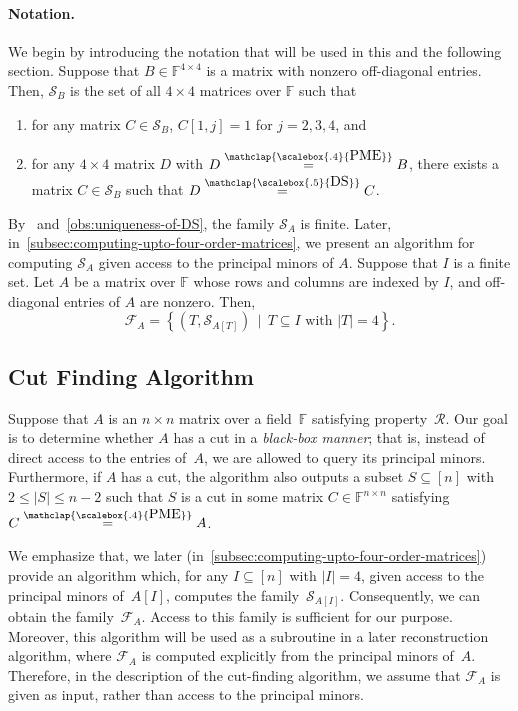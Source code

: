 \documentclass[11pt,letterpaper]{article}
\newcommand{\F}{\mathbb{F}}
\newcommand{\DS}{\stackrel{\mathclap{\scalebox{.5}{\mbox{DS}}}}{=}}
\newcommand{\PME}{\stackrel{\mathclap{\scalebox{.4}{\mbox{PME}}}}{=}}
\newcommand{\prop}{\mathcal{R}}
\newcommand{\submatrixfamily}[1]{\mathcal{F}_{#1}}
\newcommand{\fourPMEfamily}[1]{\mathcal{S}_{#1}}
\begin{document}
{{{\paragraph{Notation.} We begin by introducing the notation that will be used in this and the following section.
 Suppose that $B\in\F^{4\times 4}$ is a matrix with nonzero off-diagonal entries. Then, $\fourPMEfamily{B}$ is the set of all $4\times 4$ matrices over $\F$ such that 
\begin{enumerate}
\item for any matrix $C\in \fourPMEfamily{B}$, $C[1, j]=1$ for $j=2,3,4$, and
\item for any $4\times 4$ matrix $D$ with $D\PME B$, there exists a matrix $C\in \fourPMEfamily{B}$ such that $D\DS C$.
\end{enumerate}
By~\cite[Lemma~3.1]{Chatterjee25} and~\cref{obs:uniqueness-of-DS}, the family $\fourPMEfamily{A}$ is finite. Later, in~\cref{subsec:computing-upto-four-order-matrices}, we present an algorithm for computing $\fourPMEfamily{A}$ given access to the principal minors of $A$. Suppose that $I$ is a finite set. Let $A$ be a matrix over $\F$ whose rows and columns are indexed by $I$, and off-diagonal entries of $A$ are nonzero. Then, $$\submatrixfamily{A}=\left\{(T,\fourPMEfamily{A[T]})\,\mid\,T\subseteq I \text{ with } |T|=4\right\}.$$


\subsection{Cut Finding Algorithm}
Suppose that $A$ is an $n\times n$ matrix over a field~$\F$ satisfying property~$\prop$. Our goal is to determine whether $A$ has a cut in a \emph{black-box manner}; that is, instead of direct access to the entries of~$A$, we are allowed to query its principal minors. Furthermore, if $A$ has a cut, the algorithm also outputs a subset $S \subseteq [n]$ with $2 \le |S| \le n - 2$ such that $S$ is a cut in some matrix $C \in \F^{n\times n}$ satisfying $C \PME A$.

We emphasize that, we later (in~\cref{subsec:computing-upto-four-order-matrices}) provide an algorithm which, for any $I \subseteq [n]$ with $|I| = 4$, given access to the principal minors of~$A[I]$, computes the family~$\fourPMEfamily{A[I]}$. Consequently, we can obtain the family~$\submatrixfamily{A}$. Access to this family is sufficient for our purpose. Moreover, this algorithm will be used as a subroutine in a later reconstruction algorithm, where $\submatrixfamily{A}$ is computed explicitly from the principal minors of~$A$. Therefore, in the description of the cut-finding algorithm, we assume that $\submatrixfamily{A}$ is given as input, rather than access to the principal minors. 

}}}
\end{document}

